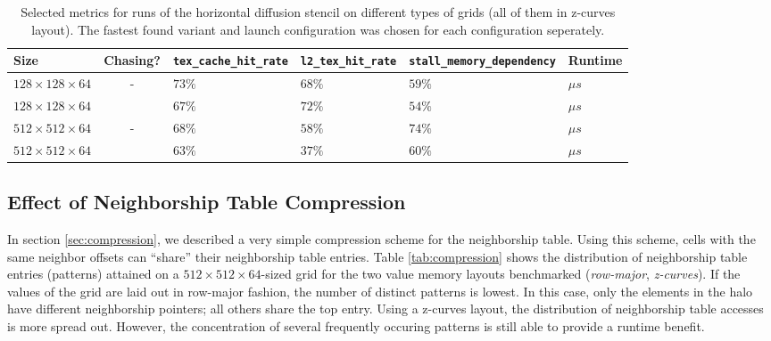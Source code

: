 \begin{table}
	\begin{tabular}{l c p{1.5cm} p{1.5cm} p{2.5cm} l}
		\hline
		\textbf{Size} & \textbf{Chasing?} & \textbf{\texttt{tex\_\allowbreak cache\_\allowbreak hit\_\allowbreak rate}} & \textbf{\texttt{l2\_\allowbreak tex\_\allowbreak hit\_\allowbreak rate}} & \textbf{\texttt{stall\_\allowbreak memory\_\allowbreak dependency}} & \textbf{Runtime} \\
		\hline
		\hline
		$128\times 128\times 64$ & - & 			$73\%$ & $68\%$ & $59\%$ & $\mu s$ \\
		$128\times 128\times 64$ & \checkmark & $67\%$ & $72\%$ & $54\%$ & $\mu s$ \\
		\hline
		$512\times 512\times 64$ & - & 			$68\%$ & $58\%$ & $74\%$ & $\mu s$ \\
		$512\times 512\times 64$ & \checkmark & $63\%$ & $37\%$ & $60\%$ & $\mu s$ \\
		\hline
	\end{tabular}
	\caption{\label{tab:chasing} Selected metrics for runs of the horizontal diffusion stencil on different types of grids (all of them in z-curves layout). The fastest found variant and launch configuration was chosen for each configuration seperately.}
\end{table}

\subsection{Effect of Neighborship Table Compression}

In section \ref{sec:compression}, we described a very simple compression scheme for the neighborship table. Using this scheme, cells with the same neighbor offsets can ``share'' their neighborship table entries. Table \ref{tab:compression} shows the distribution of neighborship table entries (patterns) attained on a $512\times 512\times 64$-sized grid for the two value memory layouts benchmarked (\emph{row-major}, \emph{z-curves}). If the values of the grid are laid out in row-major fashion, the number of distinct patterns is lowest. In this case, only the elements in the halo have different neighborship pointers; all others share the top entry. Using a z-curves layout, the distribution of neighborship table accesses is more spread out. However, the concentration of several frequently occuring patterns is still able to provide a runtime benefit.

